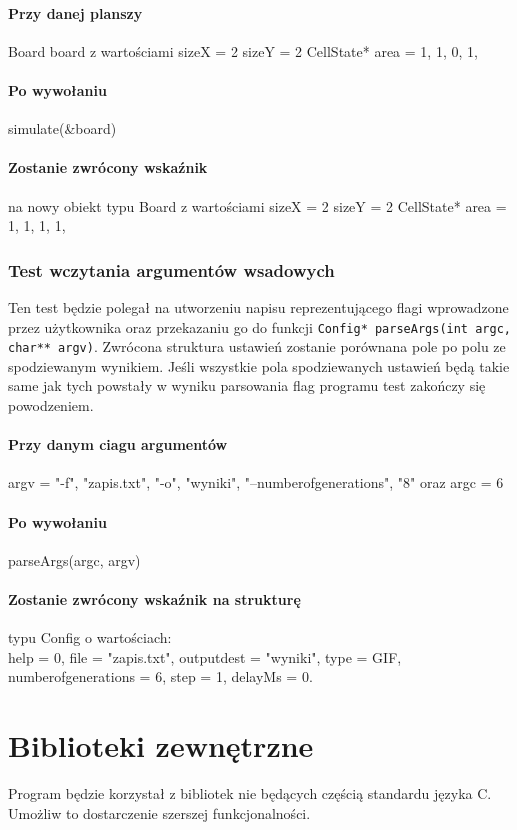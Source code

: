 \documentclass{article}
\begin{document}
\paragraph{Przy danej planszy} Board board z wartościami sizeX = 2 sizeY = 2 CellState* area = {1, 1, 0, 1,}
\paragraph{Po wywołaniu} simulate(\&board)
\paragraph{Zostanie zwrócony wskaźnik} na nowy obiekt typu Board z wartościami sizeX = 2 sizeY = 2 CellState* area = {1, 1, 1, 1,}

\subsubsection{Test wczytania argumentów wsadowych}
Ten test będzie polegał na utworzeniu napisu reprezentującego flagi wprowadzone przez użytkownika oraz przekazaniu go do funkcji \texttt{Config* parseArgs(int argc, char** argv)}. Zwrócona struktura ustawień zostanie porównana pole po polu ze spodziewanym wynikiem. Jeśli wszystkie pola spodziewanych ustawień będą takie same jak tych powstały w wyniku parsowania flag programu test zakończy się powodzeniem.

\paragraph{Przy danym ciagu argumentów} argv = {"-f", "zapis.txt", "-o", "wyniki", "--number\textunderscore{}of\textunderscore{}generations", "8"} oraz argc = 6
\paragraph{Po wywołaniu} parseArgs(argc, argv)
\paragraph{Zostanie zwrócony wskaźnik na strukturę} typu Config o wartościach: \\ help = 0, file = "zapis.txt", output\textunderscore{}dest = "wyniki", type = GIF, \\ number\textunderscore{}of\textunderscore{}generations = 6, step = 1, delayMs = 0.

\section{Biblioteki zewnętrzne}
Program będzie korzystał z bibliotek nie będących częścią standardu języka C. Umożliw to dostarczenie szerszej funkcjonalności.
\end{document}
